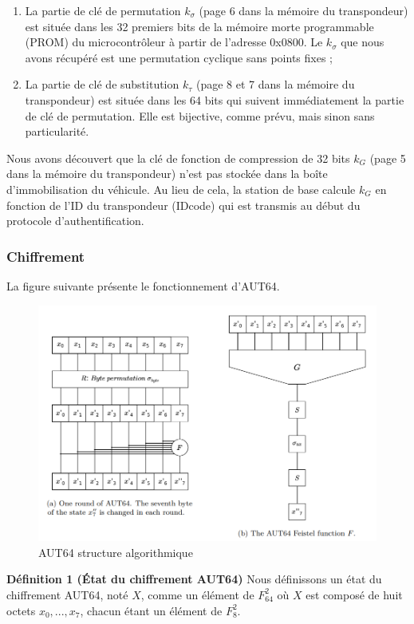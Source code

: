\documentclass{template}
\begin{document}
\begin{enumerate}
    \item La partie de clé de permutation $k_\sigma$ (page 6 dans la mémoire du transpondeur) est située dans les 32 premiers bits de la mémoire morte programmable (PROM) du microcontrôleur à partir de l'adresse 0x0800. Le $k_\sigma$ que nous avons récupéré est une permutation cyclique sans points fixes ;
    \item La partie de clé de substitution $k_\tau$ (page 8 et 7 dans la mémoire du transpondeur) est située dans les 64 bits qui suivent immédiatement la partie de clé de permutation. Elle est bijective, comme prévu, mais sinon sans particularité.
\end{enumerate}

Nous avons découvert que la clé de fonction de compression de 32 bits $k_G$ (page 5 dans la mémoire du transpondeur) n'est pas stockée dans la boîte d'immobilisation du véhicule. Au lieu de cela, la station de base calcule $k_G$ en fonction de l'ID du transpondeur (IDcode) qui est transmis au début du protocole d'authentification.
\subsubsection{Chiffrement}
\baselineskip=16pt
La figure suivante présente le fonctionnement d'AUT64.
\begin{figure}
    \centering
    \includegraphics[width=\textwidth]{Cipher.PNG}
    \caption{AUT64 structure algorithmique}
    \label{fig:image}
\end{figure}

\textbf{Définition 1  (État du chiffrement AUT64)} Nous définissons un état du chiffrement AUT64, noté $X$, comme un élément de $F_{64}^2$ où $X$ est composé de huit octets $x_0, ..., x_7$, chacun étant un élément de $F_{8}^2$.
\end{document}
